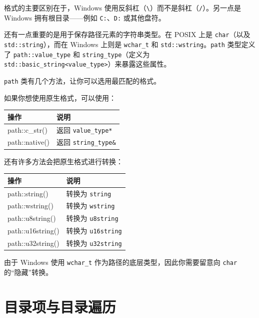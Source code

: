 格式的主要区别在于，Windows 使用反斜杠（\texttt{\textbackslash}）而不是斜杠（\texttt{/}）。另一点是 Windows 拥有根目录——例如 \texttt{C:}、\texttt{D:} 或其他盘符。

还有一点重要的是用于保存路径元素的字符串类型。在 POSIX 上是 \texttt{char}（以及 \texttt{std::string}），而在 Windows 上则是 \texttt{wchar\_t} 和 \texttt{std::wstring}。\texttt{path} 类型定义了 \texttt{path::value\_type} 和 \texttt{string\_type}（定义为 \texttt{std::basic\_string<value\_type>}）来暴露这些属性。

\texttt{path} 类有几个方法，让你可以选用最匹配的格式。

如果你想使用原生格式，可以使用：

\begin{table}[H]
\centering
\begin{tabularx}{\textwidth}{>{\ttfamily\raggedright\arraybackslash}X >{\raggedright\arraybackslash}X}
\toprule
操作 & 说明 \\
\midrule
path::c\_str() & 返回 \texttt{value\_type*} \\
path::native() & 返回 \texttt{string\_type\&} \\
\bottomrule
\end{tabularx}
\end{table}

还有许多方法会把原生格式进行转换：

\begin{table}[H]
\centering
\begin{tabularx}{\textwidth}{>{\ttfamily\raggedright\arraybackslash}X >{\raggedright\arraybackslash}X}
\toprule
操作 & 说明 \\
\midrule
path::string() & 转换为 \texttt{string} \\
path::wstring() & 转换为 \texttt{wstring} \\
path::u8string() & 转换为 \texttt{u8string} \\
path::u16string() & 转换为 \texttt{u16string} \\
path::u32string() & 转换为 \texttt{u32string} \\
\bottomrule
\end{tabularx}
\end{table}

由于 Windows 使用 \texttt{wchar\_t} 作为路径的底层类型，因此你需要留意向 \texttt{char} 的“隐藏”转换。

\section{目录项与目录遍历}

